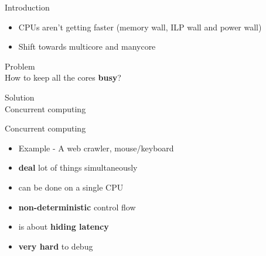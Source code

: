\else
\begin{frame}{Introduction}
\begin{itemize}
\item \small CPUs aren't getting faster (memory wall, ILP wall and power wall)
\item \small Shift towards multicore and manycore
\end{itemize}
\begin{center}
\Large {\color{red} Problem}\\
How to keep all the cores \textbf{busy}?
\end{center}
\pause
\begin{center}
\Large {\color{blue} Solution}\\
Concurrent computing
\end{center}
\end{frame}

\begin{frame}{Concurrent computing}
\begin{itemize}
\item Example - A web crawler, mouse/keyboard
\item \textbf{deal} lot of things simultaneously
\item can be done on a single CPU
\item \textbf{non-deterministic} control flow
\item is about \textbf{hiding latency}
\item \textbf{very hard} to debug
\end{itemize}
\end{frame}
\fi